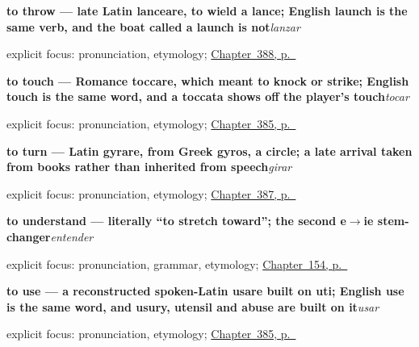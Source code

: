 \noindent\begin{minipage}[t]{\linewidth}
\raggedright
\textbf{to throw — late Latin lanceare, to wield a lance; English launch is the same verb, and the boat called a launch is not}\enspace\emph{lanzar}\par
\footnotesize explicit focus: pronunciation, etymology; \hyperref[ch:empujar-y-lanzar]{Chapter~388, p.~\pageref*{ch:empujar-y-lanzar}}
\end{minipage}\par\smallskip

\noindent\begin{minipage}[t]{\linewidth}
\raggedright
\textbf{to touch — Romance toccare, which meant to knock or strike; English touch is the same word, and a toccata shows off the player's touch}\enspace\emph{tocar}\par
\footnotesize explicit focus: pronunciation, etymology; \hyperref[ch:usar-y-tocar]{Chapter~385, p.~\pageref*{ch:usar-y-tocar}}
\end{minipage}\par\smallskip

\noindent\begin{minipage}[t]{\linewidth}
\raggedright
\textbf{to turn — Latin gyrare, from Greek gyros, a circle; a late arrival taken from books rather than inherited from speech}\enspace\emph{girar}\par
\footnotesize explicit focus: pronunciation, etymology; \hyperref[ch:quemar-y-cruzar]{Chapter~387, p.~\pageref*{ch:quemar-y-cruzar}}
\end{minipage}\par\smallskip

\noindent\begin{minipage}[t]{\linewidth}
\raggedright
\textbf{to understand — literally \textquotedblleft{}to stretch toward\textquotedblright{}; the second e$\to$ie stem-changer}\enspace\emph{entender}\par
\footnotesize explicit focus: pronunciation, grammar, etymology; \hyperref[ch:spanish-entender]{Chapter~154, p.~\pageref*{ch:spanish-entender}}
\end{minipage}\par\smallskip

\noindent\begin{minipage}[t]{\linewidth}
\raggedright
\textbf{to use — a reconstructed spoken-Latin usare built on uti; English use is the same word, and usury, utensil and abuse are built on it}\enspace\emph{usar}\par
\footnotesize explicit focus: pronunciation, etymology; \hyperref[ch:usar-y-tocar]{Chapter~385, p.~\pageref*{ch:usar-y-tocar}}
\end{minipage}\par\smallskip

